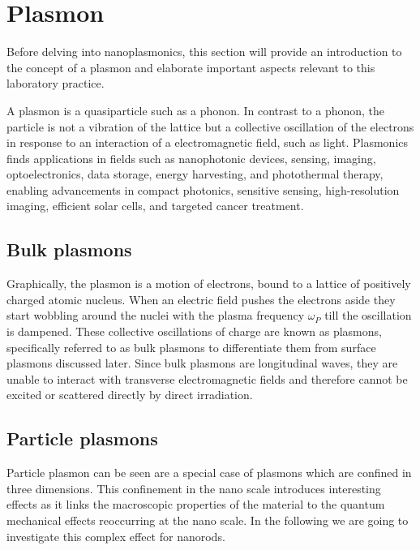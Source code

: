 \section{Plasmon}
\label{sec:TheoPlas}

Before delving into nanoplasmonics, this section will provide an introduction to the concept of a plasmon
and elaborate important aspects relevant to this laboratory practice.

A plasmon is a quasiparticle such as a phonon. In contrast to a phonon, the particle is not a vibration of 
the lattice but a collective oscillation of the electrons in response to an interaction of a electromagnetic field, such as light. 
Plasmonics finds applications in fields such as nanophotonic devices, sensing, imaging, optoelectronics, data storage, energy harvesting, and photothermal therapy, enabling advancements in compact photonics, sensitive sensing, high-resolution imaging, efficient solar cells, and targeted cancer treatment.

\subsection*{Bulk plasmons}

Graphically, the plasmon is a motion of electrons, bound to a lattice of positively charged atomic nucleus. When an electric field pushes the 
electrons aside they start wobbling around the nuclei with the plasma frequency $\omega_P$ till the oscillation is dampened. 
These collective oscillations of charge are known as plasmons, specifically referred to as bulk plasmons to differentiate them from surface plasmons discussed later. Since bulk plasmons are longitudinal waves, they are unable to interact with transverse electromagnetic fields and therefore cannot be excited or scattered directly by direct irradiation.

\subsection{Particle plasmons}

Particle plasmon can be seen are a special case of plasmons which are confined in three dimensions. This 
confinement in the nano scale introduces interesting effects as it links the macroscopic properties of the 
material to the quantum mechanical effects reoccurring at the nano scale. In the following we are going to 
investigate this complex effect for nanorods. 

